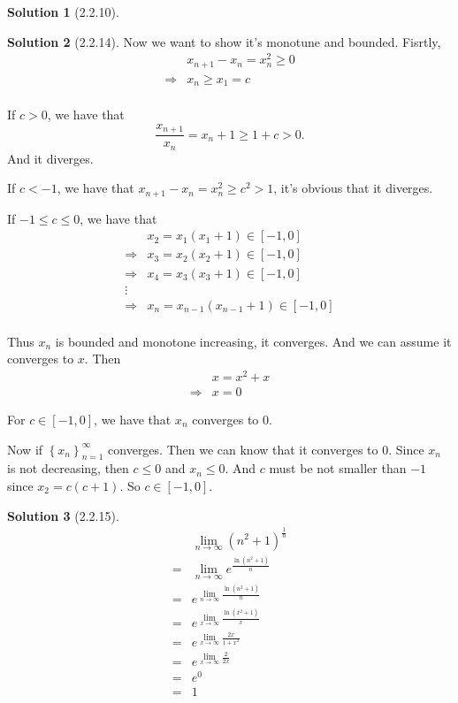 \documentclass{article}
\theoremstyle{definition}
\newtheorem{sol}{Solution}[exe]
\begin{document}
\begin{sol}[2.2.10]
    
\end{sol}

\begin{sol}[2.2.14]

    Now we want to show it's monotune and bounded. Fisrtly, 
    \begin{align*}
        &x_{n+1}-x_{n}=x_{n}^{2}\geq 0\\
        \Rightarrow &x_{n} \geq x_{1}=c\\
    \end{align*} 

    If $c>0$, we have that $$\frac{x_{n+1}}{x_{n}}=x_{n}+1\geq 1+c >0.$$
    And it diverges.

    If $c<-1$, we have that $x_{n+1}-x_{n}=x_{n}^{2}\geq c^{2}>1$, it's obvious that it diverges.
    
    If $-1\leq c\leq 0$, we have that 
    \begin{align*}
    &x_{2}=x_{1}(x_{1}+1)\in[-1,0]\\
    \Rightarrow &x_{3}=x_{2}(x_{2}+1)\in[-1,0]\\
    \Rightarrow &x_{4}=x_{3}(x_{3}+1)\in[-1,0]\\
    \vdots\\
    \Rightarrow &x_{n}=x_{n-1}(x_{n-1}+1)\in[-1,0]\\
    \end{align*}

    Thus $x_{n}$ is bounded and monotone increasing, it converges. And we can assume it converges to $x$. Then
\begin{align*}
    &x=x^{2}+x\\
    \Rightarrow & x=0
\end{align*}
    
    For $c\in[-1,0]$, we have that $x_{n}$ converges to $0$.

Now if $\left\{x_{n}\right\}_{n=1}^{\infty}$ converges. Then we can know that it converges to $0$. Since $x_{n}$ is not decreasing, then $c\leq 0$ and $x_{n}\leq0$.
And $c$ must be not smaller than $-1$ since $x_{2}=c(c+1)$. So $c\in[-1,0]$.
\end{sol}

\begin{sol}[2.2.15]
    \begin{align*}
        & \lim_{n\to\infty}(n^2+1)^{\frac{1}{n}}\\
        =& \lim_{n\to\infty}e^{\frac{\ln(n^2+1)}{n}}\\
        =& e^{\lim_{n\to\infty}\frac{\ln(n^2+1)}{n}}\\
        =& e^{\lim_{x\to\infty}\frac{\ln(x^2+1)}{x}}\\
        =& e^{\lim_{x\to\infty}\frac{2x}{1+x^2}}\\
        =& e^{\lim_{x\to\infty}\frac{2}{2x}}\\
        =& e^{0}\\
        =& 1
    \end{align*}
\end{sol}
\end{document}
